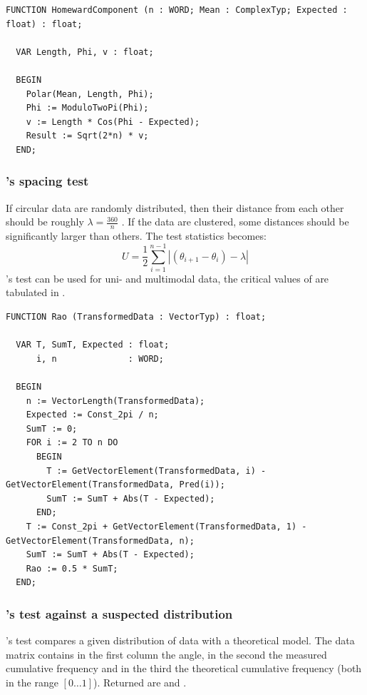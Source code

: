 \begin{refsection}
\begin{lstlisting}[caption=V-test for random distribution against suspected direction]
  FUNCTION HomewardComponent (n : WORD; Mean : ComplexTyp; Expected : float) : float;

  VAR Length, Phi, v : float;

  BEGIN
    Polar(Mean, Length, Phi);
    Phi := ModuloTwoPi(Phi);
    v := Length * Cos(Phi - Expected);
    Result := Sqrt(2*n) * v;
  END;
\end{lstlisting}

\subsubsection{'s spacing test}

If circular data are randomly distributed, then their distance from each other should be roughly \( \lambda = \frac{360}{n} \) \parencite{Rao-76}. If the data are clustered, some distances should be significantly larger than others. The test statistics becomes:
\begin{equation}
  U = \frac{1}{2} \sum_{i=1}^{n-1}{|(\theta_{i+1} - \theta_i) - \lambda|}
\end{equation}
's test can be used for uni- and multimodal data, the critical values of  are tabulated in \parencite{Rus-95}.

\begin{lstlisting}[caption=\Name{Rao}'s test]
  FUNCTION Rao (TransformedData : VectorTyp) : float;

  VAR T, SumT, Expected : float;
      i, n              : WORD;

  BEGIN
    n := VectorLength(TransformedData);
    Expected := Const_2pi / n;
    SumT := 0;
    FOR i := 2 TO n DO
      BEGIN
        T := GetVectorElement(TransformedData, i) - GetVectorElement(TransformedData, Pred(i));
        SumT := SumT + Abs(T - Expected);
      END;
    T := Const_2pi + GetVectorElement(TransformedData, 1) - GetVectorElement(TransformedData, n);
    SumT := SumT + Abs(T - Expected);
    Rao := 0.5 * SumT;
  END;
\end{lstlisting}

\subsubsection{'s test against a suspected distribution}

's test compares a given distribution of data with a theoretical model. The data matrix contains in the first column the angle, in the second the measured cumulative frequency and in the third the theoretical cumulative frequency (both in the range \( [0\ldots 1] \)). Returned are  and .


\end{refsection}
